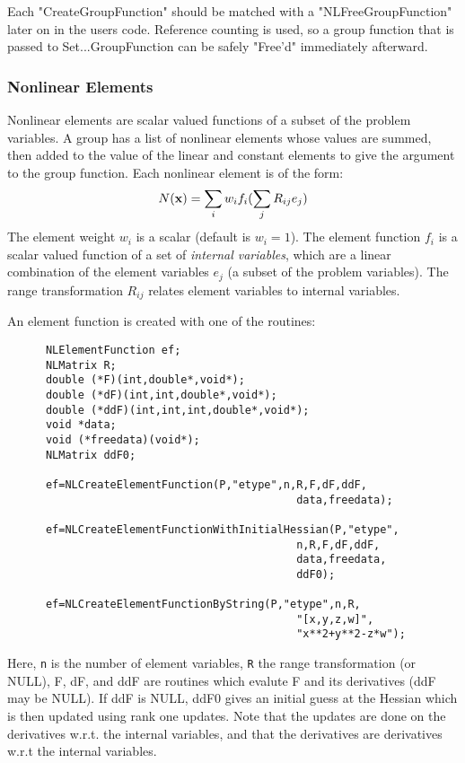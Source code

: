\documentclass[12pt]{article}
\begin{document}
      Each "CreateGroupFunction" should be matched with a "NLFreeGroupFunction" later on in the users code. Reference
      counting is used, so a group function that is passed to Set...GroupFunction can be safely "Free'd" immediately 
      afterward.

   \subsubsection{Nonlinear Elements}

      Nonlinear elements are scalar valued functions of a subset of the problem variables. A group has a list of nonlinear
      elements whose values are summed, then added to the value of the linear and constant elements to give the argument
      to the group function. Each nonlinear element is of the form:
     \begin{displaymath}
          N({\bf x}) = \sum_i w_i f_i( \sum_j R_{ij} e_j )
     \end{displaymath}
     The element weight $w_i$ is a scalar (default is $w_i=1$). The element function $f_i$ is a scalar valued function
     of a set of {\it internal variables}, which are a linear combination of the element variables $e_j$ (a subset of
     the problem variables). The range transformation $R_{ij}$ relates element variables to internal variables.

     An element function is created with one of the routines:
     \begin{verbatim}
      NLElementFunction ef;
      NLMatrix R;
      double (*F)(int,double*,void*);
      double (*dF)(int,int,double*,void*);
      double (*ddF)(int,int,int,double*,void*);
      void *data;
      void (*freedata)(void*);
      NLMatrix ddF0;

      ef=NLCreateElementFunction(P,"etype",n,R,F,dF,ddF,
                                             data,freedata);

      ef=NLCreateElementFunctionWithInitialHessian(P,"etype",
                                             n,R,F,dF,ddF,
                                             data,freedata,
                                             ddF0);

      ef=NLCreateElementFunctionByString(P,"etype",n,R,
                                             "[x,y,z,w]",
                                             "x**2+y**2-z*w");
     \end{verbatim}
     Here, {\tt n} is the number of element variables, {\tt R} the range transformation (or NULL), F, dF, and ddF
     are routines which evalute F and its derivatives (ddF may be NULL). If ddF is NULL, ddF0 gives an initial
     guess at the Hessian which is then updated using rank one updates. Note that the updates are done on the
     derivatives w.r.t. the internal variables, and that the derivatives are derivatives w.r.t the internal variables.
\end{document}
